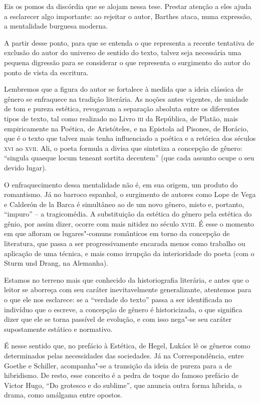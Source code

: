 Eis os pomos da discórdia que se alojam nessa tese. Prestar atenção a
eles ajuda a esclarecer algo importante: ao rejeitar o autor, Barthes
ataca, numa expressão, a mentalidade burguesa moderna.

A partir desse ponto, para que se entenda o que representa a recente
tentativa de exclusão do autor do universo de sentido do texto, talvez
seja necessária uma pequena digressão para se considerar o que
representa o surgimento do autor do ponto de vista da escritura.

Lembremos que a figura do autor se fortalece à medida que a ideia
clássica de gênero se enfraquece na tradição literária. As noções antes
vigentes, de unidade de tom e pureza estética, revogavam a separação
absoluta entre os diferentes tipos de texto, tal como realizado no Livro
\textsc{iii} da República, de Platão, mais empiricamente na Poética, de
Aristóteles, e na Epistola ad Pisones, de Horácio, que é o texto que
talvez mais tenha influenciado a poética e a retórica dos séculos
\textsc{xvi} ao \textsc{xvii}. Ali, o poeta formula a divisa que
sintetiza a concepção de gênero: ``singula quaeque locum teneant sortita
decentem'' (que cada assunto ocupe o seu devido lugar).

O enfraquecimento dessa mentalidade não é, em sua origem, um produto do
romantismo. Já no barroco espanhol, o surgimento de autores como Lope de
Vega e Calderón de la Barca é simultâneo ao de um novo gênero, misto e,
portanto, ``impuro'' -- a tragicomédia. A substituição da estética do
gênero pela estética do gênio, por assim dizer, ocorre com mais nitidez
no século \textsc{xviii}. É esse o momento em que afloram os
lugares"-comuns românticos em torno da concepção de literatura, que passa
a ser progressivamente encarada menos como trabalho ou aplicação de uma
técnica, e mais como irrupção da interioridade do poeta (com o Sturm und
Drang, na Alemanha).

Estamos no terreno mais que conhecido da historiografia literária, e
antes que o leitor se aborreça com seu caráter inevitavelmente
generalizante, atentemos para o que ele nos esclarece: se a ``verdade do
texto'' passa a ser identificada no indivíduo que o escreve, a concepção
de gênero é historicizada, o que significa dizer que ele se torna
passível de evolução, e com isso nega"-se seu caráter supostamente
estático e normativo.

É nesse sentido que, no prefácio à Estética, de Hegel, Lukács lê os
gêneros como determinados pelas necessidades das sociedades. Já na
Correspondência, entre Goethe e Schiller, acompanha"-se a transição da
ideia de pureza para a de hibridismo. De resto, esse conceito é a pedra
de toque do famoso prefácio de Victor Hugo, ``Do grotesco e do
sublime'', que anuncia outra forma híbrida, o drama, como amálgama entre
opostos.


